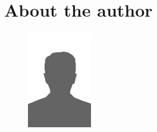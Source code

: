 
\chapter*{About the author}


\begin{figure}
    \centering
    \includegraphics[width=0.25\textwidth]{img/authorpicture.jpg}
\end{figure}

\lipsum[5-7]


